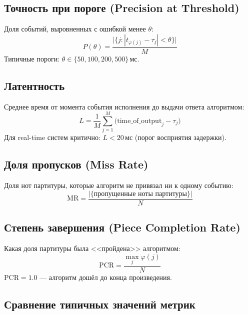 \documentclass[a4paper,11pt]{article}
\begin{document}
\subsection{Точность при пороге (Precision at Threshold)}

\begin{formulabox}[title={Precision at Threshold $\theta$}]
Доля событий, выровненных с ошибкой менее $\theta$:
\[
  P(\theta) = \frac{\bigl|\{j : |t_{\varphi(j)} - \tau_j| < \theta\}\bigr|}{M}
\]
Типичные пороги: $\theta \in \{50, 100, 200, 500\}$\,мс.
\end{formulabox}

\subsection{Латентность}

\begin{formulabox}[title={Latency}]
Среднее время от момента события исполнения до выдачи ответа алгоритмом:
\[
  L = \frac{1}{M} \sum_{j=1}^{M}
  \bigl(\text{time\_of\_output}_j - \tau_j\bigr)
\]
Для real-time систем критично: $L < 20$\,мс (порог восприятия задержки).
\end{formulabox}

\subsection{Доля пропусков (Miss Rate)}

\begin{formulabox}[title={Miss Rate}]
Доля нот партитуры, которые алгоритм не привязал ни к одному событию:
\[
  \mathrm{MR} = \frac{|\{\text{пропущенные ноты партитуры}\}|}{N}
\]
\end{formulabox}

\subsection{Степень завершения (Piece Completion Rate)}

\begin{formulabox}[title={Piece Completion Rate}]
Какая доля партитуры была <<пройдена>> алгоритмом:
\[
  \mathrm{PCR} = \frac{\max_j \varphi(j)}{N}
\]
$\mathrm{PCR} = 1.0$ --- алгоритм дошёл до конца произведения.
\end{formulabox}

\subsection{Сравнение типичных значений метрик}
\end{document}

